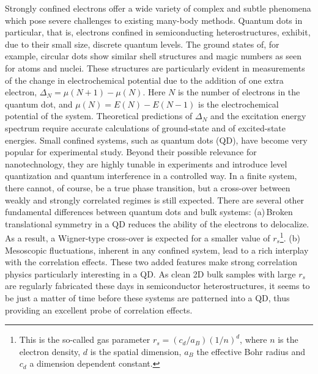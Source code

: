 \documentclass[twocolumn]{revtex4}
\begin{document}
Strongly confined electrons
offer a wide variety of complex and subtle phenomena which pose severe 
challenges to existing many-body methods.
Quantum dots in particular, that is, electrons confined in semiconducting heterostructures,
exhibit, due to their small size, discrete quantum levels. 
The ground states of, for example, circular dots
show similar shell structures and magic numbers 
as seen for atoms and nuclei. These structures are particularly evident in
measurements of the change in electrochemical potential due to the addition of
one extra electron, 
$\Delta_N=\mu(N+1)-\mu(N)$. Here $N$ is the number of electrons in the quantum dot, and
$\mu(N)=E(N)-E(N-1)$ is the electrochemical potential of the system.
Theoretical predictions of $\Delta_N$ and the excitation energy spectrum require
accurate calculations of ground-state and of excited-state energies.
Small confined systems, such as quantum dots (QD), have become very popular for experimental 
study. Beyond their possible relevance for nanotechnology, they are highly tunable 
in experiments and introduce level quantization and quantum interference in a controlled way. In a finite system, 
there cannot, of course, be a true phase transition, but a cross-over between weakly and strongly correlated regimes is 
still expected. There are several other fundamental differences between quantum dots and bulk systems: (a)\,Broken translational 
symmetry in a QD reduces the ability of the electrons to delocalize. As a result, a Wigner-type cross-over 
is expected for a smaller value of $r_s$\footnote{This is the so-called gas parameter $r_s=(c_d/a_B)(1/n)^d$, where $n$ is the electron density, $d$ is the spatial dimension, $a_B$ the effective Bohr radius and  $c_d$ a dimension dependent constant.}. (b)\,Mesoscopic fluctuations, inherent in any confined system, 
lead to a rich interplay with the correlation effects. These two added features make strong correlation physics particularly 
interesting in a QD. As clean 2D bulk samples with large $r_s$ are regularly fabricated these days in semiconductor 
heterostructures, it seems to be just a matter of time before these systems are patterned into a QD, 
thus providing an excellent probe of correlation effects.
\end{document}
